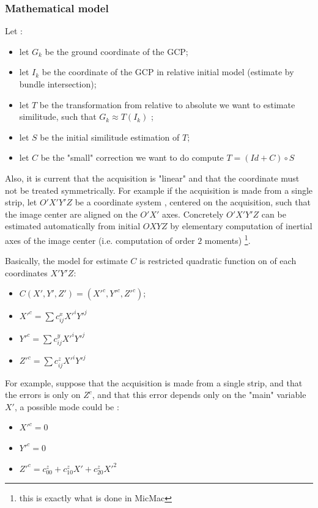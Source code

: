 \subsubsection{Mathematical model}

Let :

\begin{itemize}
   \item let $G_k$ be the ground coordinate of the GCP;
   \item let $I_k$ be the coordinate of the GCP in relative initial model (estimate by bundle intersection);
   \item let $T$ be the transformation from relative to absolute we want to estimate similitude, such that  $G_k \approx T(I_k)$ ;
   \item let $S$ be the initial similitude estimation of $T$;
   \item let $C$ be the "small" correction we want to do compute $T= (Id+C) \circ S$
\end{itemize}


Also, it is current that the acquisition is "linear" and that the coordinate must not be treated
symmetrically. For example if the acquisition is made from a single strip, let $O'X'Y'Z$ be a
coordinate system ,  centered on the acquisition, such that the image center are aligned on the $O'X'$ axes.
Concretely $O'X'Y'Z$ can be estimated automatically from initial $OXYZ$ by elementary computation of inertial axes of the
image center (i.e. computation of order $2$ moments) \footnote{this is exactly what is done in MicMac}.



Basically, the model for estimate $C$ is restricted  quadratic function on of  each coordinates $X'Y'Z$:

\begin{itemize}
   \item $C(X',Y',Z') = (X'^c,Y'^c,Z'^c)$;
   \item $X'^c = \sum c^x_{ij} X'^i Y'^j$
   \item $Y'^c = \sum c^y_{ij} X'^i Y'^j$
   \item $Z'^c = \sum c^z_{ij} X'^i Y'^j$
\end{itemize}


For example, suppose that the acquisition is made from a single strip, and
that the errors is only on $Z^c$,  and that this error depends only on  the
"main" variable $X'$, a possible mode could be :

\begin{itemize}
   \item $X'^c = 0$
   \item $Y'^c = 0$
   \item $Z'^c =  c^z_{00} + c^z_{10} X' + c^z_{20} X'^2$
\end{itemize}


